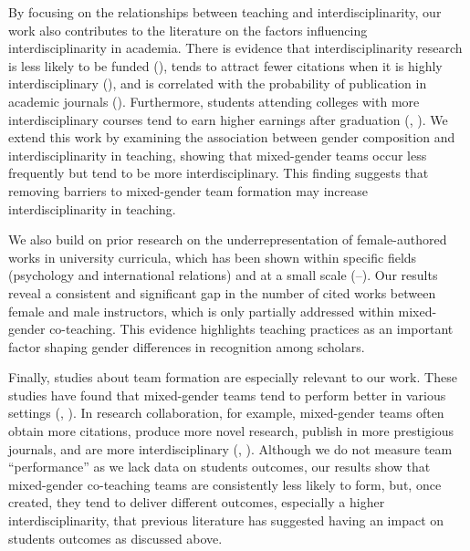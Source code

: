 \documentclass[
  12pt,
]{article}
\begin{document}
By focusing on the relationships between teaching and interdisciplinarity, our work also contributes to the literature on the factors influencing interdisciplinarity in academia. There is evidence that interdisciplinarity research is less likely to be funded (), tends to attract fewer citations when it is highly interdisciplinary (), and is correlated with the probability of publication in academic journals (). Furthermore, students attending colleges with more interdisciplinary courses tend to earn higher earnings after graduation (, ). We extend this work by examining the association between gender composition and interdisciplinarity in teaching, showing that mixed-gender teams occur less frequently but tend to be more interdisciplinary. This finding suggests that removing barriers to mixed-gender team formation may increase interdisciplinarity in teaching.

We also build on prior research on the underrepresentation of female-authored works in university curricula, which has been shown within specific fields (psychology and international relations) and at a small scale (--). Our results reveal a consistent and significant gap in the number of cited works between female and male instructors, which is only partially addressed within mixed-gender co-teaching. This evidence highlights teaching practices as an important factor shaping gender differences in recognition among scholars.

Finally, studies about team formation are especially relevant to our work. These studies have found that mixed-gender teams tend to perform better in various settings (, ). In research collaboration, for example, mixed-gender teams often obtain more citations, produce more novel research, publish in more prestigious journals, and are more interdisciplinary (, ). Although we do not measure team ``performance'' as we lack data on students outcomes, our results show that mixed-gender co-teaching teams are consistently less likely to form, but, once created, they tend to deliver different outcomes, especially a higher interdisciplinarity, that previous literature has suggested having an impact on students outcomes as discussed above.
\end{document}

